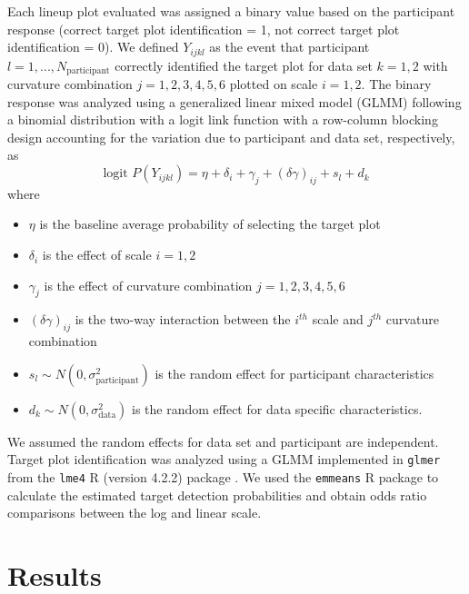 \documentclass[12pt]{article}
\begin{document}
Each lineup plot evaluated was assigned a binary value based on the
participant response (correct target plot identification = 1, not
correct target plot identification = 0). We defined \(Y_{ijkl}\) as the
event that participant \(l = 1,...,N_\text{participant}\) correctly
identified the target plot for data set \(k = 1,2\) with curvature
combination \(j = 1,2,3,4,5,6\) plotted on scale \(i = 1,2\). The binary
response was analyzed using a generalized linear mixed model (GLMM)
following a binomial distribution with a logit link function with a
row-column blocking design accounting for the variation due to
participant and data set, respectively, as \begin{equation}
\text{logit }P(Y_{ijkl}) = \eta + \delta_i + \gamma_j + (\delta \gamma)_{ij} + s_l + d_k
\end{equation} \noindent where

\begin{itemize}
\item $\eta$ is the baseline average probability of selecting the target plot
\item $\delta_i$ is the effect of scale $i = 1,2$
\item $\gamma_j$ is the effect of curvature combination $j = 1,2,3,4,5,6$
\item $(\delta\gamma)_{ij}$ is the two-way interaction between the $i^{th}$ scale and $j^{th}$ curvature combination
\item $s_l \sim N(0,\sigma^2_\text{participant})$ is the random effect for participant characteristics
\item $d_k \sim N(0,\sigma^2_{\text{data}})$ is the random effect for data specific characteristics. 
\end{itemize}

\noindent We assumed the random effects for data set and participant are
independent. Target plot identification was analyzed using a GLMM
implemented in \texttt{glmer} from the \texttt{lme4} R (version 4.2.2)
package \citep{lme4}. We used the \texttt{emmeans} R package
\citep{emmeans} to calculate the estimated target detection
probabilities and obtain odds ratio comparisons between the log and
linear scale.

\hypertarget{results}{%
\section{Results}\label{results}}
\end{document}
